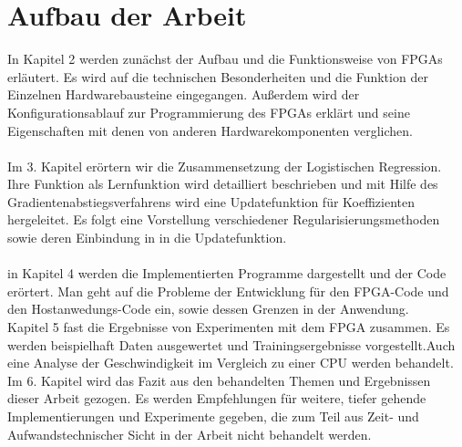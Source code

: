 \section{Aufbau der Arbeit}
In Kapitel 2 werden zunächst der Aufbau und die Funktionsweise von FPGAs erläutert. Es wird auf die technischen Besonderheiten und die Funktion der Einzelnen Hardwarebausteine eingegangen. Außerdem wird der Konfigurationsablauf zur Programmierung des FPGAs erklärt und seine Eigenschaften mit denen von anderen Hardwarekomponenten verglichen.\\\\
Im 3. Kapitel erörtern wir die Zusammensetzung der Logistischen Regression. Ihre Funktion als Lernfunktion wird detailliert beschrieben und mit Hilfe des Gradientenabstiegsverfahrens wird eine Updatefunktion für Koeffizienten hergeleitet. Es folgt eine Vorstellung verschiedener Regularisierungsmethoden sowie deren Einbindung in in die Updatefunktion.\\\\
in Kapitel 4 werden die Implementierten Programme dargestellt und der Code erörtert. Man geht auf die Probleme der Entwicklung für den FPGA-Code und den Hostanwedungs-Code ein, sowie dessen Grenzen in der Anwendung.\\
Kapitel 5 fast die Ergebnisse von Experimenten mit dem FPGA zusammen. Es werden beispielhaft Daten ausgewertet und Trainingsergebnisse vorgestellt.Auch eine Analyse der Geschwindigkeit im Vergleich zu einer CPU werden behandelt. \\Im 6. Kapitel wird das Fazit aus den behandelten Themen und Ergebnissen dieser Arbeit gezogen. Es werden Empfehlungen für weitere, tiefer gehende Implementierungen und Experimente gegeben, die zum Teil aus Zeit- und Aufwandstechnischer Sicht in der Arbeit nicht behandelt werden.
